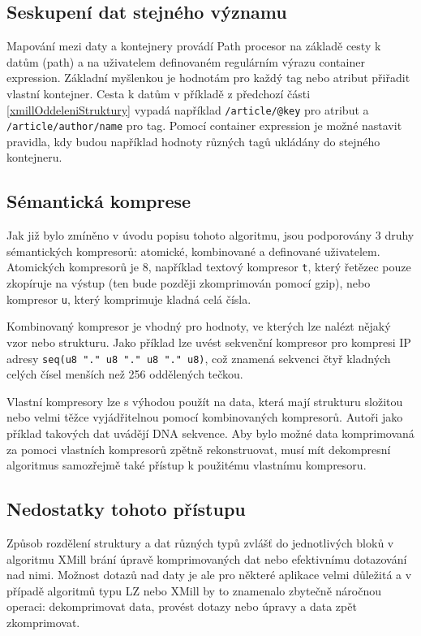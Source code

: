\subsection{Seskupení dat stejného významu}
Mapování mezi daty a kontejnery provádí Path procesor na základě cesty k datům (path) a na uživatelem definovaném regulárním výrazu container expression. Základní myšlenkou je hodnotám pro každý tag nebo atribut přiřadit vlastní kontejner. Cesta k datům v příkladě z předchozí části \ref{xmillOddeleniStruktury} vypadá například \texttt{/article/@key} pro atribut a \texttt{/article/author/name} pro tag. Pomocí container expression je možné nastavit pravidla, kdy budou například hodnoty různých tagů ukládány do stejného kontejneru. \cite{xmill}

\subsection{Sémantická komprese}
Jak již bylo zmíněno v úvodu popisu tohoto algoritmu, jsou podporovány 3 druhy sémantických kompresorů: atomické, kombinované a definované uživatelem. Atomických kompresorů je 8, například textový kompresor \texttt{t}, který řetězec pouze zkopíruje na výstup (ten bude později zkomprimován pomocí gzip), nebo kompresor \texttt{u}, který komprimuje kladná celá čísla.

Kombinovaný kompresor je vhodný pro hodnoty, ve kterých lze nalézt nějaký vzor nebo strukturu. Jako příklad lze uvést sekvenční kompresor pro kompresi IP adresy \texttt{seq(u8 "." u8 "." u8 "." u8)}, což znamená sekvenci čtyř kladných celých čísel menších než 256 oddělených tečkou.

Vlastní kompresory lze s výhodou použít na data, která mají strukturu složitou nebo velmi těžce vyjádřitelnou pomocí kombinovaných kompresorů. Autoři jako příklad takových dat uvádějí DNA sekvence. Aby bylo možné data komprimovaná za pomoci vlastních kompresorů zpětně rekonstruovat, musí mít dekompresní algoritmus samozřejmě také přístup k použitému vlastnímu kompresoru. \cite{xmill}

\subsection{Nedostatky tohoto přístupu}
Způsob rozdělení struktury a dat různých typů zvlášť do jednotlivých bloků v algoritmu XMill brání úpravě komprimovaných dat nebo efektivnímu dotazování nad nimi. Možnost dotazů nad daty je ale pro některé aplikace velmi důležitá a v případě algoritmů typu LZ nebo XMill by to znamenalo zbytečně náročnou operaci: dekomprimovat data, provést dotazy nebo úpravy a data zpět zkomprimovat.

